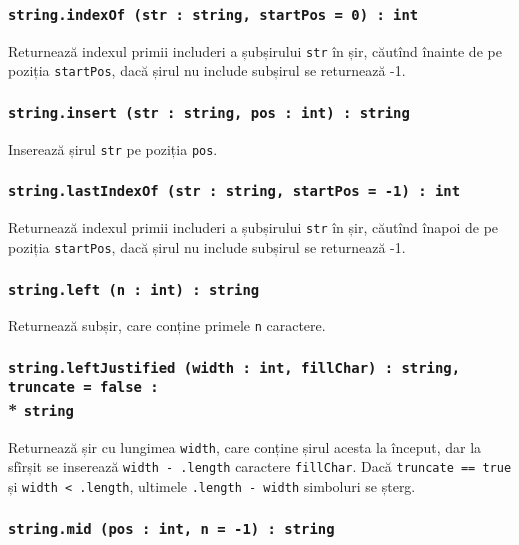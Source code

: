\subsubsection{\texttt{string.indexOf (str : string, startPos = 0) : int}}

Returnează indexul primii includeri a șubșirului \texttt{str} în șir, căutînd înainte de pe poziția \texttt{startPos}, dacă șirul nu include subșirul se returnează -1.

\subsubsection{\texttt{string.insert (str : string, pos : int) : string}}

Inserează șirul \texttt{str} pe poziția \texttt{pos}.

\subsubsection{\texttt{string.lastIndexOf (str : string, startPos = -1) : int}}

Returnează indexul primii includeri a șubșirului \texttt{str} în șir, căutînd înapoi de pe poziția \texttt{startPos}, dacă șirul nu include subșirul se returnează -1.

\subsubsection{\texttt{string.left (n : int) : string}}

Returnează subșir, care conține primele \texttt{n} caractere.

\subsubsection{\texttt{string.leftJustified (width : int, fillChar) : string, truncate = false :}\\* \texttt{string}}

Returnează șir cu lungimea \texttt{width}, care conține șirul acesta la început, dar la sfîrșit se inserează \texttt{width - .length} caractere \texttt{fillChar}. Dacă \texttt{truncate == true} și \texttt{width < .length}, ultimele \texttt{.length - width} simboluri se șterg.

\subsubsection{\texttt{string.mid (pos : int, n = -1) : string}}

